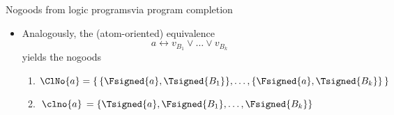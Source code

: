 \begin{frame}{Nogoods from logic programs}{via program completion}
  \begin{itemize}
  \item Analogously, the (atom-oriented) equivalence
    \[
    a \leftrightarrow v_{B_1} \vee \dots \vee v_{B_k}
    \]
    yields the nogoods
    \par\medskip
    \begin{enumerate}\normalsize
    \item
      \(
      \ClNo{a} = \{\,\{\Fsigned{a},\Tsigned{B_1}\},\dots,\{\Fsigned{a},\Tsigned{B_k}\}\,\}
      \)
    \medskip
    \item
      \(
      \,\clno{a}\, = \{\Tsigned{a},\Fsigned{B_1},\dots,\Fsigned{B_k}\}
      \)
  \end{enumerate}
  \end{itemize}
\end{frame}
